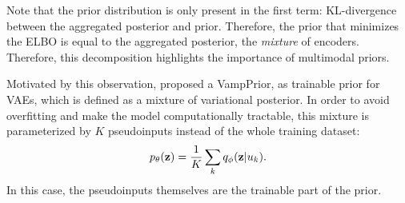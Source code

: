 Note that the prior distribution is only present in the first term: KL-divergence between the aggregated posterior and prior. Therefore, the prior that minimizes the ELBO is equal to the aggregated posterior, the \textit{mixture} of encoders. Therefore, this decomposition highlights the importance of multimodal priors. 

Motivated by this observation, \citet{tomczak2018vae} proposed a VampPrior, as trainable prior for VAEs, which is defined as a mixture of variational posterior. In order to avoid overfitting and make the model computationally tractable, this mixture is parameterized by $K$ pseudoinputs instead of the whole training dataset:
\begin{equation}
    p_{\theta}({\mathbf{z}}) = \frac1K \sum_k q_{\phi}({\mathbf{z}}|u_k).
\end{equation}
In this case, the pseudoinputs themselves are the trainable part of the prior. 


